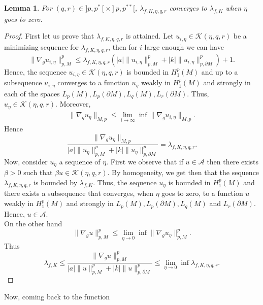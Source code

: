 \documentclass{Tran-l}
\newtheorem{lem}[thm]{Lemma}
\theoremstyle{definition}
\theoremstyle{remark}
\numberwithin{equation}{section}
\begin{document}
\begin{lem}\label{lem5.5}
 For $(q,r)\in]p,p^*[\times]p,p^{**}[$,
$\lambda_{f,K,\eta,q,r}$ converges to $\lambda_{f,K}$ when $\eta$
goes to zero.
\end{lem}
\begin{proof}
First let us prove that $\lambda_{f,K,\eta,q,r}$ is attained. Let
$u_{i,\eta}\in{\mathcal{K}}(\eta,q,r)$ be a minimizing sequence for
$\lambda_{f,K,\eta,q,r}$, then for $i$ large enough we can have
\begin{equation*}
\|\nabla_gu_{i,\eta}\|^p_{p,M}
\leq\lambda_{f,K,\eta,q,r}(|a|{\|u_{i,\eta}\|_{p,M}^p+|k|\|u_{i,\eta}\|_{p,\partial
M}^p})+1.
\end{equation*}
Hence, the sequence $u_{i,\eta}\in{\mathcal{K}}(\eta,q,r)$ is bounded in
$H_1^p(M)$ and up to a subsequence $u_{i,\eta}$ converges to a
function $u_{\eta}$ weakly in $H_1^p(M)$ and strongly  in each of
the spaces $L_p(M),L_p(\partial M),L_q(M),L_r(\partial M)$. Thus,
$u_{\eta}\in{\mathcal{K}}(\eta,q,r)$. Moreover,
\begin{eqnarray*}
\|\nabla_gu_{\eta}\|_{M,p}\leq \lim_{i\rightarrow\infty}\inf
\|\nabla_gu_{i,\eta}\|_{M,p}.
\end{eqnarray*}
Hence
\begin{equation*}
 \frac{ \|\nabla_gu_{\eta}\|_{M,p}}
{{|a|\|u_{\eta}\|_{p,M}^p+|k|\|u_{\eta}\|_{p,\partial
M}^p}}=\lambda_{f,K,\eta,q,r}.
\end{equation*}
Now, consider $ u_{\eta}$ a sequence of $\eta$. First we observe
that if $u\in{\mathcal{A}}$ then there exists $\beta>0$ such that $\beta
u\in{\mathcal{K}}(\eta,q,r)$. By homogeneity, we get then that the sequence
$\lambda_{f,K,\eta,q,r}$ is bounded by $\lambda_{f,K}$. Thus, the
sequence $ u_{\eta}$ is bounded in $H_1^p(M)$ and there exists a
subsequence that converges, when $\eta$ goes to zero, to a function
$u$ weakly in $H_1^p(M)$ and strongly in $L_p(M),L_p(\partial
M),L_q(M)$ and
$L_r(\partial M)$. Hence, $u\in {\mathcal{A}}$.\\
On the other hand
\begin{equation*}
\|\nabla_gu\|^p_{p,M}\leq\lim_{\eta\rightarrow0}\inf
\|\nabla_gu_{\eta}\|^p_{p,M}.
\end{equation*}
Thus
\begin{equation*}
\lambda_{f,K}\leq\frac{\|\nabla_gu\|^p_{p,M}}{|a|\|u\|_{p,M}^p+|k|\|u\|_{p,\partial
M}^p}\leq\lim_{\eta\rightarrow0}\inf\lambda_{f,K,\eta,q,r}.
\end{equation*}
\end{proof}
Now, coming back to the function
\end{document}

